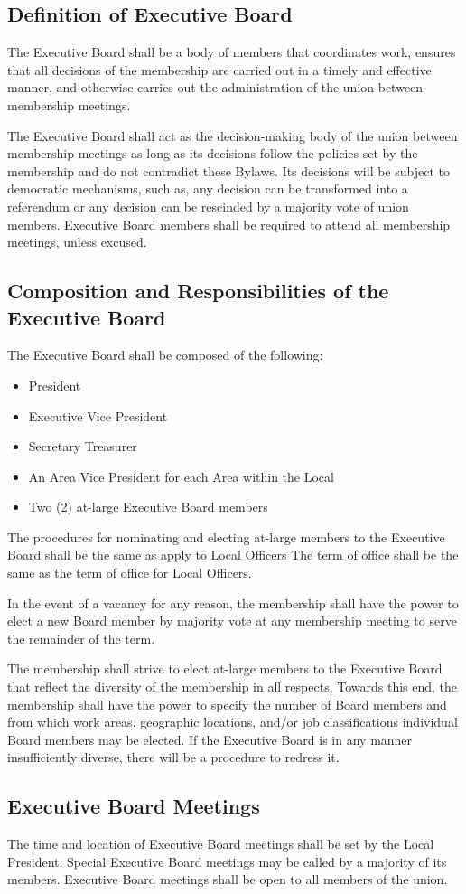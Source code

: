 \documentclass[11pt]{article}
\newcommand{\articlesection}[1]{\vspace{.25cm}\subsection{#1}}
\begin{document}
\articlesection{Definition of Executive Board}
The Executive Board shall be a body of members that coordinates work, ensures that all decisions of the membership are carried out in a timely and effective manner, and otherwise carries out the administration of the union between membership meetings.

The Executive Board shall act as the decision-making body of the union between membership meetings as long as its decisions follow the policies set by the membership and do not contradict these Bylaws. Its decisions will be subject to democratic mechanisms, such as, any decision can be transformed into a referendum or any decision can be rescinded by a majority vote of union members. Executive Board members shall be required to attend all membership meetings, unless excused.

\articlesection{Composition and Responsibilities of the Executive Board}
The Executive Board shall be composed of the following:

\begin{itemize}
  \item President
  \item Executive Vice President
  \item Secretary Treasurer
  \item An Area Vice President for each Area within the Local
  \item Two (2) at-large Executive Board members
\end{itemize}

The procedures for nominating and electing at-large members to the Executive Board shall be the same as apply to Local Officers The term of office shall be the same as the term of office for Local Officers.

In the event of a vacancy for any reason, the membership shall have the power to elect a new Board member by majority vote at any membership meeting to serve the remainder of the term.

The membership shall strive to elect at-large members to the Executive Board that reflect the diversity of the membership in all respects. Towards this end, the membership shall have the power to specify the number of Board members and from which work areas, geographic locations, and/or job classifications individual Board members may be elected. If the Executive Board is in any manner insufficiently diverse, there will be a procedure to redress it.

\articlesection{Executive Board Meetings}
The time and location of Executive Board meetings shall be set by the Local President. Special Executive Board meetings may be called by a majority of its members. Executive Board meetings shall be open to all members of the union.
\end{document}
